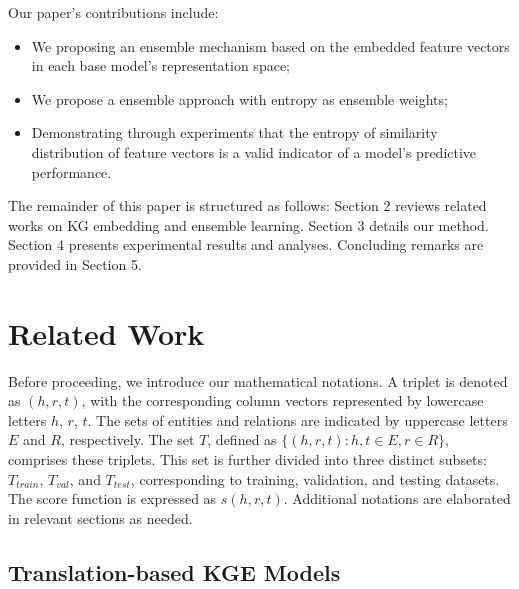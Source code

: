 \documentclass{article}
\begin{document}
Our paper's contributions include:
\begin{itemize}
    \item We proposing an ensemble mechanism based on the embedded feature vectors in each base model's representation space;
    \item We propose a ensemble approach with entropy as ensemble weights; 
    \item Demonstrating through experiments that the entropy of similarity distribution of feature vectors is a valid indicator of a model's predictive performance.
\end{itemize}


The remainder of this paper is structured as follows: Section 2 reviews related works on KG embedding and ensemble learning. Section 3 details our method. Section 4 presents experimental results and analyses. Concluding remarks are provided in Section 5.



\section{Related Work}

Before proceeding, we introduce our mathematical notations. A triplet is denoted as $(h, r, t)$, with the corresponding column vectors represented by lowercase letters $h$, $r$, $t$. The sets of entities and relations are indicated by uppercase letters $E$ and $R$, respectively. The set $T$, defined as $\{(h, r, t) : h, t \in E, r \in R\}$, comprises these triplets. This set is further divided into three distinct subsets: $T_{train}$, $T_{val}$, and $T_{test}$, corresponding to training, validation, and testing datasets. The score function is expressed as $s(h, r, t)$. Additional notations are elaborated in relevant sections as needed.


\subsection{Translation-based KGE Models}
\end{document}
